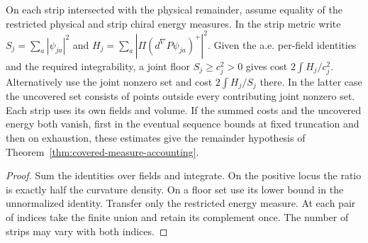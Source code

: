 \begin{proposition}
\label{prop:spin-remainder-costs}
\leanok
On each strip intersected with the physical remainder, assume equality
of the restricted physical and strip chiral energy measures. In the
strip metric write $S_j=\sum_a|\psi_{ja}|^2$ and
$H_j=\sum_a|\Pi(d^\nabla P\psi_{ja})^+|^2$. Given the a.e. per-field
identities and the required integrability, a joint floor $S_j\ge c_j^2>0$
gives cost $2\int H_j/c_j^2$. Alternatively use the joint nonzero set
and cost $2\int H_j/S_j$ there. In the latter case the uncovered set
consists of points outside every contributing joint nonzero set. Each
strip uses its own fields and volume. If the summed costs and the uncovered
energy both vanish, first in the eventual sequence bounds at fixed
truncation and then on exhaustion, these estimates give the remainder
hypothesis of Theorem~\ref{thm:covered-measure-accounting}.
\end{proposition}
\begin{proof}
\leanok
Sum the identities over fields and integrate. On the positive locus the
ratio is exactly half the curvature density. On a floor set use its
lower bound in the unnormalized identity. Transfer only the restricted
energy measure. At each pair of indices take the finite union and retain
its complement once. The number of strips may vary with both indices.
\end{proof}


